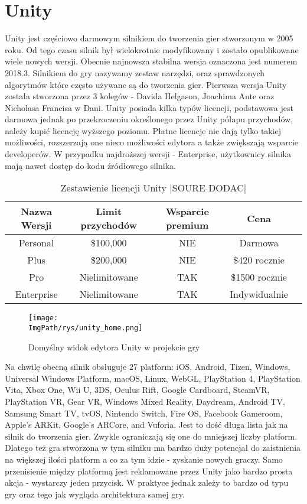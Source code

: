 \documentclass[a4paper,12pt,twoside,openany]{report}
\newcommand{\ImgPath}{.}
\begin{document}
\section{Unity}
Unity jest częściowo darmowym silnikiem do tworzenia gier stworzonym w 2005 roku. Od tego czasu silnik był wielokrotnie modyfikowany i zostało opublikowane wiele nowych wersji. Obecnie najnowsza stabilna wersja oznaczona jest numerem 2018.3\cite{unity_wiki}. Silnikiem do gry nazywamy zestaw narzędzi, oraz sprawdzonych algorytmów które często używane są do tworzenia gier. Pierwsza wersja Unity została stworzona przez 3 kolegów - Davida Helgason, Joachima Ante oraz Nicholasa Francisa w Dani. Unity posiada kilka typów licencji, podstawowa jest darmowa jednak po przekroczeniu określonego przez Unity półapu przychodów, należy kupić licencję wyższego poziomu. Płatne licencje nie dają tylko takiej możliwości, rozszerzają one nieco możliwości edytora a także zwiększają wsparcie developerów. W przypadku najdroższej wersji - Enterprise, użytkownicy silnika mają nawet dostęp do kodu źródłowego silnika.

\begin{table}[h!]
\centering
\begin{tabular}{c|cccc}
Nazwa Wersji & Limit przychodów & Wsparcie premium & Cena \\ \hline
Personal & \$100,000 & NIE & Darmowa \\
Plus & \$200,000 & NIE & \$420 rocznie \\
Pro & Nielimitowane & TAK & \$1500 rocznie \\
Enterprise & Nielimitowane & TAK & Indywidualnie \\
\end{tabular}
\caption{Zestawienie licencji Unity |SOURE DODAC|}
\label{table_unity_versions}
\end{table}

\begin{figure}[!htbp]
	\begin{center}
\centering
\texttt{[image: \\ImgPath/rys/unity\_home.png]}
\end{center}
	\caption{Domyślny widok edytora Unity w projekcie gry}
	\label{unity_home}
\end{figure}

Na chwilę obecną silnik obsługuje 27 platform: iOS, Android, Tizen, Windows, Universal Windows Platform, macOS, Linux, WebGL, PlayStation 4, PlayStation Vita, Xbox One, Wii U, 3DS, Oculus Rift, Google Cardboard, SteamVR, PlayStation VR, Gear VR, Windows Mixed Reality, Daydream, Android TV, Samsung Smart TV, tvOS, Nintendo Switch, Fire OS, Facebook Gameroom, Apple's ARKit, Google's ARCore, and Vuforia. Jest to dość długa lista jak na silnik do tworzenia gier. Zwykle ograniczają się one do mniejszej liczby platform. Dlatego też gra stworzona w tym silniku ma bardzo duży potencjał do zaistnienia na większej ilości platform a co za tym idzie - zyskanie nowych graczy. Samo przenisienie między platformą jest reklamowane przez Unity jako bardzo prosta akcja - wystarczy jeden przycisk. W praktyce jednak zależy to bardzo od typu gry oraz tego jak wygląda architektura samej gry.
\end{document}
